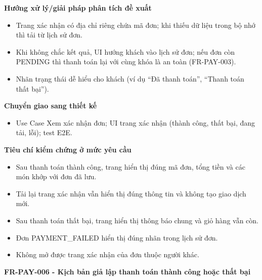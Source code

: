 \documentclass[11pt,a4paper,oneside]{report}
\begin{document}
\textbf{Hướng xử lý/giải pháp phân tích đề xuất}

\begin{itemize}
\item
  Trang xác nhận có địa chỉ riêng chứa mã đơn; khi thiếu dữ liệu trong bộ nhớ thì tải từ lịch sử đơn.
\item
  Khi không chắc kết quả, UI hướng khách vào lịch sử đơn; nếu đơn còn PENDING thì thanh toán lại với cùng khóa là an toàn (FR-PAY-003).
\item
  Nhãn trạng thái dễ hiểu cho khách (ví dụ ``Đã thanh toán'', ``Thanh toán thất bại'').
\end{itemize}

\textbf{Chuyển giao sang thiết kế}

\begin{itemize}
\item
  Use Case Xem xác nhận đơn; UI trang xác nhận (thành công, thất bại, đang tải, lỗi); test E2E.
\end{itemize}

\textbf{Tiêu chí kiểm chứng ở mức yêu cầu}

\begin{itemize}
\item
  Sau thanh toán thành công, trang hiển thị đúng mã đơn, tổng tiền và các món khớp với đơn đã lưu.
\item
  Tải lại trang xác nhận vẫn hiển thị đúng thông tin và không tạo giao dịch mới.
\item
  Sau thanh toán thất bại, trang hiển thị thông báo chung và giỏ hàng vẫn còn.
\item
  Đơn PAYMENT\_FAILED hiển thị đúng nhãn trong lịch sử đơn.
\item
  Không mở được trang xác nhận của đơn thuộc người khác.
\end{itemize}

\textbf{FR-PAY-006 - Kịch bản giả lập thanh toán thành công hoặc thất bại}
\end{document}
